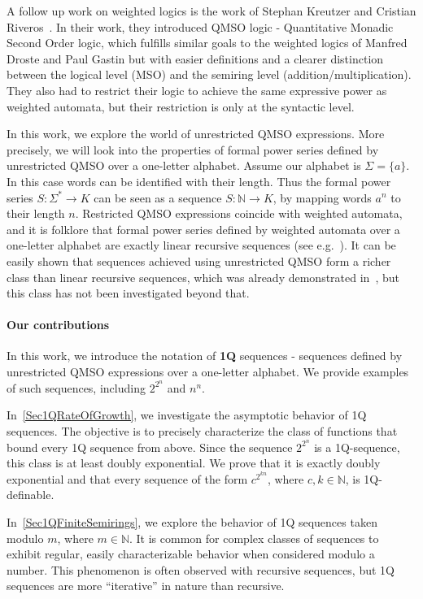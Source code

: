 \documentclass[en]{pracamgr}
\theoremstyle{definition}
\begin{document}
A follow up work on weighted logics is the work of Stephan Kreutzer and Cristian Riveros~\cite{KreutzerR13}. In their work, they introduced QMSO logic - Quantitative Monadic Second Order logic, which fulfills similar goals to the weighted logics of Manfred Droste and Paul Gastin but with easier definitions and a clearer distinction between the logical level (MSO) and the semiring level (addition/multiplication). They also had to restrict their logic to achieve the same expressive power as weighted automata, but their restriction is only at the syntactic level.

In this work, we explore the world of unrestricted QMSO expressions. More precisely, we will look into the properties of formal power series defined by unrestricted QMSO over a one-letter alphabet. Assume our alphabet is $\Sigma = \{a\}$. In this case words can be identified with their length. Thus the formal power series $S: \Sigma^* \rightarrow K$ can be seen as a sequence $S: \mathbb{N} \rightarrow K$, by mapping words $a^n$ to their length $n$. Restricted QMSO expressions coincide with weighted automata, and it is folklore that formal power series defined by weighted automata over a one-letter alphabet are exactly linear recursive sequences (see e.g.~\cite{BarloyFLM22}). It can be easily shown that sequences achieved using unrestricted QMSO form a richer class than linear recursive sequences, which was already demonstrated in~\cite{CadilhacMPPS20}, but this class has not been investigated beyond that.

\paragraph*{Our contributions}
\label{ourcontrib}
In this work, we introduce the notation of \textbf{1Q} sequences - sequences defined by unrestricted QMSO expressions over a one-letter alphabet. We provide examples of such sequences, including $2^{2^n}$ and $n^n$.

In~\cref{Sec1QRateOfGrowth}, we investigate the asymptotic behavior of 1Q sequences. The objective is to precisely characterize the class of functions that bound every 1Q sequence from above. Since the sequence $2^{2^n}$ is a 1Q-sequence, this class is at least doubly exponential. We prove that it is exactly doubly exponential and that every sequence of the form $c^{2^{kn}}$, where $c, k \in \mathbb{N}$, is 1Q-definable.

In~\cref{Sec1QFiniteSemirings}, we explore the behavior of 1Q sequences taken modulo $m$, where $m \in \mathbb{N}$. It is common for complex classes of sequences to exhibit regular, easily characterizable behavior when considered modulo a number. This phenomenon is often observed with recursive sequences, but 1Q sequences are more ``iterative'' in nature than recursive.
\end{document}
